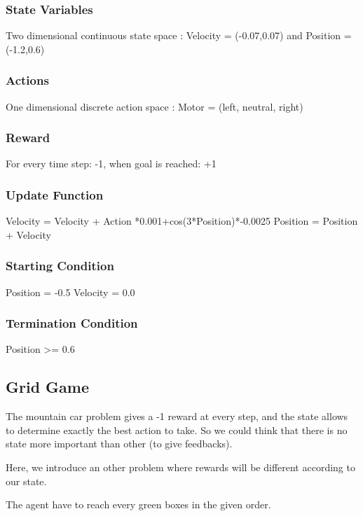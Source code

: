 \documentclass[a4paper,12pt]{article}
\begin{document}
    \subsubsection{State Variables}
    Two dimensional continuous state space : Velocity = (-0.07,0.07) and Position = (-1.2,0.6)
    
    \subsubsection{Actions}
     One dimensional discrete action space : Motor = (left, neutral, right)
     
     \subsubsection{Reward}
      For every time step: -1, when goal is reached: +1

    \subsubsection{Update Function}
    Velocity = Velocity + Action *0.001+cos(3*Position)*-0.0025
    \newline Position = Position + Velocity

    \subsubsection{Starting Condition}
    Position = -0.5 Velocity = 0.0
    
    \subsubsection{Termination Condition}
    Position >= 0.6
    
    
    
    \subsection{Grid Game}

The mountain car problem gives a -1 reward at every step, and the state allows to 
    determine exactly the best action to take. So we could think that there is no state more important than other (to give feedbacks). 

Here, we introduce an other problem where rewards will be different according to our state.
    
    The agent have to reach every green boxes in the given order.
\end{document}
